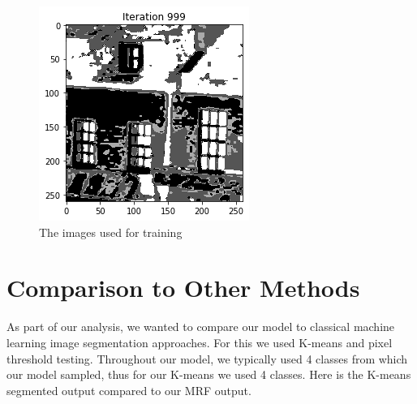 \documentclass[11pt]{article}
\begin{document}
\begin{figure}[!htb]
\begin{center}
\begin{multicols}{5}
	\includegraphics[height = \linewidth]{house_1000}\par
\end{multicols}

\caption{The images used for training}
\end{center}
\end{figure}


\section{Comparison to Other Methods}
As part of our analysis, we wanted to compare our model to classical machine learning image segmentation approaches.
For this we used K-means and pixel threshold testing.
Throughout our model, we typically used 4 classes from which our model sampled, thus for our K-means we used 4 classes.
Here is the K-means segmented output compared to our MRF output.
\end{document}
